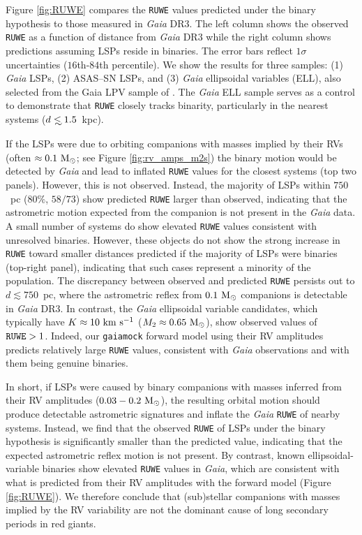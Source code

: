 \documentclass[trackchanges,twocolumn]{aastex631}
\begin{document}
Figure \ref{fig:RUWE} compares the {\tt RUWE} values predicted under the binary hypothesis to those measured in {\it Gaia} DR3. The left column shows the observed {\tt RUWE} as a function of distance from {\it Gaia} DR3 while the right column shows predictions assuming LSPs reside in binaries. The error bars reflect $1\sigma$ uncertainties ($16$th-$84$th percentile).
We show the results for three samples: (1) {\it Gaia} LSPs, (2) ASAS--SN LSPs, and (3) {\it Gaia} ellipsoidal variables (ELL), also selected from the Gaia LPV sample of \citep[][]{Gaia_FPR}. The {\it Gaia} ELL sample serves as a control to demonstrate that {\tt RUWE} closely tracks binarity, particularly in the nearest systems ($d\lsim1.5$~kpc).

If the LSPs were due to orbiting companions with masses implied by their RVs (often $\approx0.1~{\rm M_\odot}$; see Figure \ref{fig:rv_amps_m2s}) the binary motion would be detected by {\it Gaia} and lead to inflated {\tt RUWE} values for the closest systems (top two panels). However, this is not observed. Instead, the majority of LSPs within $750$~pc ($80\%$, $58/73$) show predicted {\tt RUWE} larger than observed, indicating that the astrometric motion expected from the companion is not present in the {\it Gaia} data. A small number of systems do show elevated {\tt RUWE} values consistent with unresolved binaries. However, these objects do not show the strong increase in {\tt RUWE} toward smaller distances predicted if the majority of LSPs were binaries (top-right panel), indicating that such cases represent a minority of the population.
The discrepancy between observed and predicted {\tt RUWE} persists out to $d\lesssim750$~pc, where the astrometric reflex from $0.1~{\rm M_\odot}$ companions is detectable in {\it Gaia} DR3. 
In contrast, the {\it Gaia} ellipsoidal variable candidates, which typically have $K\approx10~{\rm km~s^{-1}}$ ($M_2\approx0.65~{\rm M_\odot}$), show observed values of ${\tt RUWE}>1$. Indeed, our {\tt gaiamock} forward model using their RV amplitudes predicts relatively large {\tt RUWE} values, consistent with {\it Gaia} observations and with them being genuine binaries.

In short, if LSPs were caused by binary companions with masses inferred from their RV amplitudes ($0.03-0.2~{\rm M_\odot}$), the resulting orbital motion should produce detectable astrometric signatures and inflate the {\it Gaia} {\tt RUWE} of nearby systems. Instead, we find that the observed {\tt RUWE} of LSPs under the binary hypothesis is significantly smaller than the predicted value, indicating that the expected astrometric reflex motion is not present. By contrast, known ellipsoidal-variable binaries show elevated {\tt RUWE} values in {\it Gaia}, which are consistent with what is predicted from their RV amplitudes with the forward model (Figure \ref{fig:RUWE}). We therefore conclude that (sub)stellar companions with masses implied by the RV variability are not the dominant cause of long secondary periods in red giants.
\end{document}
